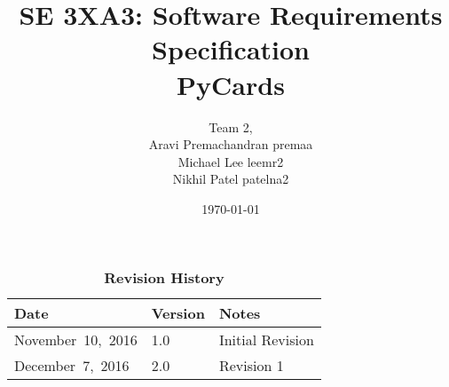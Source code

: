 \documentclass[12pt, titlepage]{article}
\title{SE 3XA3: Software Requirements Specification\\PyCards}
\author{Team 2,
		\\ Aravi Premachandran premaa
		\\ Michael Lee leemr2
		\\ Nikhil Patel patelna2
}
\date{\today}
\begin{document}
	\maketitle
	\tableofcontents
	\listoftables
	\listoffigures
	\begin{table}[bp]
		\caption{\bf Revision History}
		\begin{tabularx}{\textwidth}{p{4cm}p{2cm}X}
			\toprule {\bf Date} & {\bf Version} & {\bf Notes}\\
			\midrule
			\mbox{November 10, 2016} & 1.0 & Initial Revision\\
			\mbox{December 7, 2016} & 2.0 & Revision 1\\
			\bottomrule
		\end{tabularx}
	\end{table}
	\newpage
	\indent
	\newpage
\end{document}
